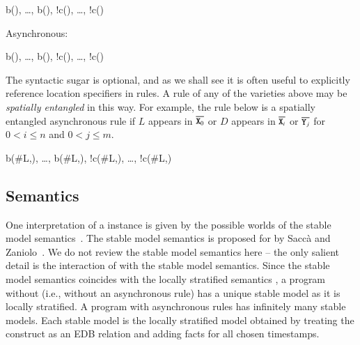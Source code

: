 \begin{Drules}
        {b(), \ldots, b(), !c(), \ldots, !c()}
\end{Drules}

%

Asynchronous:

\begin{Drules}
        {b(), \ldots, b(), !c(), \ldots, !c()}
\end{Drules}

The syntactic sugar is optional, and as we shall see it is often useful to explicitly reference location specifiers in rules.  A rule of any of the
varieties above may be \emph{spatially entangled} in this way. For example, the rule below is a spatially entangled asynchronous rule if $L$ appears
in $\od{X\sub{0}}$ or $D$ appears in $\od{X\sub{i}}$ or $\od{Y\sub{j}}$ for $0 <
i \leq n$ and $0 < j \leq m$. 

\begin{Drules}
        {b(\#L,), \ldots, b(\#L,), !c(\#L,), \ldots, !c(\#L,)}
\end{Drules}


\subsection{Semantics}
One interpretation of a \lang instance is given by the possible worlds of the
stable model semantics~\cite{stable-model}.  The stable model semantics is proposed for  by Sacc\`{a} and Zaniolo~\cite{sacca-zaniolo}.
We do not review the stable model
semantics here -- the only salient detail is the interaction of 
with the stable model semantics.  Since the stable model semantics coincides with the locally stratified semantics , a \lang program without  (i.e., without an asynchronous rule) has a unique stable model as it is locally stratified.  A \lang program with asynchronous rules has infinitely many stable models.  Each stable model is the locally stratified model obtained by treating the  construct as an EDB relation and adding facts for all chosen timestamps.

